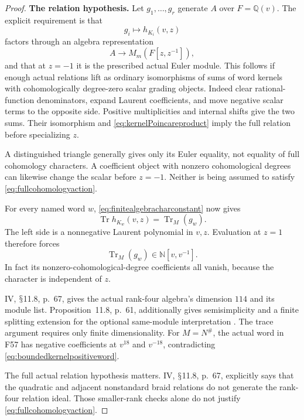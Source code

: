 \documentclass[11pt,a4paper]{article}
\newcommand{\Q}{\mathbb Q}\newcommand{\Z}{\mathbb Z}\newcommand{\C}{\mathbb C}\newcommand{\N}{\mathbb N}\newcommand{\F}{\mathbb F}
\renewcommand{\S}{\ensuremath{\mathsection}}
\newcommand{\fid}[1]{\textsf{#1}}\newcommand{\gate}[1]{\textsf{#1}}
\theoremstyle{named}\newtheorem{finding}{Finding}[section]
\theoremstyle{definition}\newtheorem{definition}[finding]{Definition}
\theoremstyle{remark}\newtheorem{remark}[finding]{Remark}
\begin{document}
\begin{proof}
\par\smallskip\noindent\textbf{The relation hypothesis.}\quad
Let \(g_1,\ldots,g_r\) generate \(A\) over \(F=\Q(v)\).
The explicit requirement is that
\[
g_i\longmapsto h_{K_i}(v,z)
\]
factors through an algebra representation
\begin{equation}\label{eq:fullcohomologyaction}
A\longrightarrow M_m(F[z,z^{-1}]),
\end{equation}
and that at \(z=-1\) it is the prescribed actual Euler module.
This follows if enough actual relations lift as ordinary
isomorphisms of sums of word kernels with cohomologically
degree-zero scalar grading objects.
Indeed clear rational-function denominators, expand Laurent
coefficients, and move negative scalar terms to the opposite
side. Positive multiplicities and internal shifts give the
two sums. Their isomorphism and
\eqref{eq:kernelPoincareproduct} imply the full relation before
specializing \(z\).

A distinguished triangle generally gives only its Euler
equality, not equality of full cohomology characters.
A coefficient object with nonzero cohomological degrees
can likewise change the scalar before \(z=-1\).
Neither is being assumed to satisfy
\eqref{eq:fullcohomologyaction}.

For every named word \(w\),
\eqref{eq:finitealgebracharconstant} now gives
\[
\operatorname{Tr}h_{K_w}(v,z)
=\operatorname{Tr}_{M}(g_w).
\]
The left side is a nonnegative Laurent polynomial in \(v,z\).
Evaluation at \(z=1\) therefore forces
\begin{equation}\label{eq:boundedkernelpositiveword}
\operatorname{Tr}_{M}(g_w)\in\mathbb N[v,v^{-1}].
\end{equation}
In fact its nonzero-cohomological-degree coefficients all vanish,
because the character is independent of \(z\).

IV, \S11.8, p.~67, gives the actual rank-four algebra's
dimension \(114\) and its module list.
Proposition~11.8, p.~61, additionally gives semisimplicity and
a finite splitting extension for the optional same-module
interpretation \cite{IV}.
The trace argument requires only finite dimensionality.
For \(M=N^\#\), the actual word in \fid{F57} has negative
coefficients at \(v^{18}\) and \(v^{-18}\), contradicting
\eqref{eq:boundedkernelpositiveword}.

The full actual relation hypothesis matters.
IV, \S11.8, p.~67, explicitly says that the quadratic and
adjacent nonstandard braid relations do not generate the
rank-four relation ideal. Those smaller-rank checks alone
do not justify \eqref{eq:fullcohomologyaction}.


\end{proof}
\end{document}
